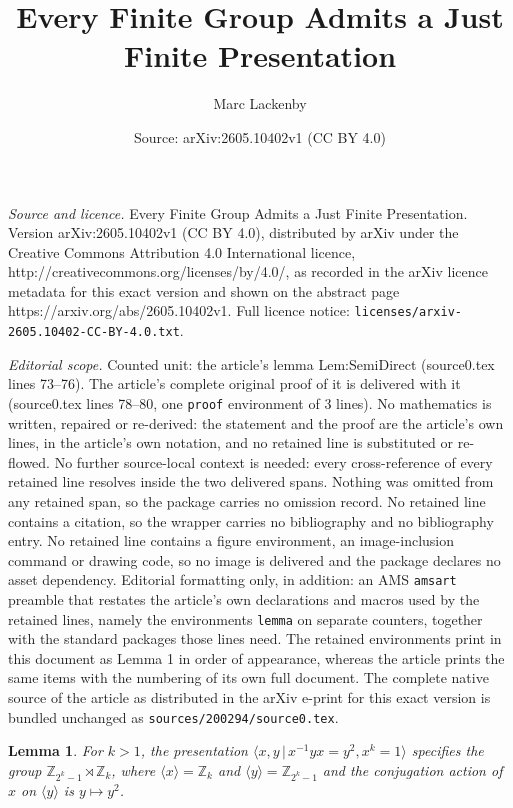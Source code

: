 \documentclass[10pt,a4paper]{amsart}
\title{Every Finite Group Admits a Just Finite Presentation}
\author{Marc Lackenby}
\date{Source: arXiv:2605.10402v1 (CC BY 4.0)}
\newtheorem{lemma}{Lemma}
\begin{document}
\maketitle

\noindent\emph{Source and licence.} Every Finite Group Admits a Just Finite Presentation. Version arXiv:2605.10402v1 (CC BY 4.0), distributed by arXiv under the Creative Commons Attribution 4.0 International licence, http://creativecommons.org/licenses/by/4.0/, as recorded in the arXiv licence metadata for this exact version and shown on the abstract page https://arxiv.org/abs/2605.10402v1. Full licence notice: \texttt{licenses/arxiv-2605.10402-CC-BY-4.0.txt}.\par\smallskip

\noindent\textit{Editorial scope.} Counted unit: the article's lemma Lem:SemiDirect (source0.tex lines 73--76). The article's complete original proof of it is delivered with it (source0.tex lines 78--80, one \texttt{proof} environment of 3 lines). No mathematics is written, repaired or re-derived: the statement and the proof are the article's own lines, in the article's own notation, and no retained line is substituted or re-flowed.  No further source-local context is needed: every cross-reference of every retained line resolves inside the two delivered spans.  Nothing was omitted from any retained span, so the package carries no omission record.  No retained line contains a citation, so the wrapper carries no bibliography and no bibliography entry.  No retained line contains a figure environment, an image-inclusion command or drawing code, so no image is delivered and the package declares no asset dependency.  Editorial formatting only, in addition: an AMS \texttt{amsart} preamble that restates the article's own declarations and macros used by the retained lines, namely the environments \texttt{lemma} on separate counters, together with the standard packages those lines need.  The retained environments print in this document as Lemma 1 in order of appearance, whereas the article prints the same items with the numbering of its own full document.  The complete native source of the article as distributed in the arXiv e-print for this exact version is bundled unchanged as \texttt{sources/200294/source0.tex}.
\begin{lemma}
\label{Lem:SemiDirect}
For $k > 1$, the presentation $\langle x, y \, | \, x^{-1} y x = y^2, x^k = 1 \rangle$ specifies the group $\mathbb{Z}_{2^k-1} \rtimes \mathbb{Z}_k$, where $\langle x \rangle = \mathbb{Z}_k$ and $\langle y \rangle = \mathbb{Z}_{2^k-1}$ and the conjugation action of $x$ on $\langle y \rangle$ is $y \mapsto y^2$.
\end{lemma}
\end{document}
